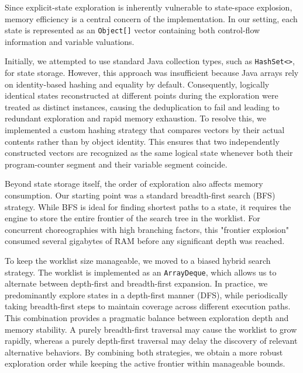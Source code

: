 Since explicit-state exploration is inherently vulnerable to state-space explosion, memory efficiency is a central concern of the implementation. In our setting, each state is represented as an \texttt{Object[]} vector containing both control-flow information and variable valuations.

Initially, we attempted to use standard Java collection types, such as \texttt{HashSet<>}, for state storage. However, this approach was insufficient because Java arrays rely on identity-based hashing and equality by default. Consequently, logically identical states reconstructed at different points during the exploration were treated as distinct instances, causing the deduplication to fail and leading to redundant exploration and rapid memory exhaustion. To resolve this, we implemented a custom hashing strategy that compares vectors by their actual contents rather than by object identity. This ensures that two independently constructed vectors are recognized as the same logical state whenever both their program-counter segment and their variable segment coincide.

Beyond state storage itself, the order of exploration also affects memory consumption. Our starting point was a standard breadth-first search (BFS) strategy. While BFS is ideal for finding shortest paths to a state, it requires the engine to store the entire frontier of the search tree in the worklist. For concurrent choreographies with high branching factors, this "frontier explosion" consumed several gigabytes of RAM before any significant depth was reached.

To keep the worklist size manageable, we moved to a biased hybrid search strategy. The worklist is implemented as an \texttt{ArrayDeque}, which allows us to alternate between depth-first and breadth-first expansion. In practice, we predominantly explore states in a depth-first manner (DFS), while periodically taking breadth-first steps to maintain coverage across different execution paths. This combination provides a pragmatic balance between exploration depth and memory stability. A purely breadth-first traversal may cause the worklist to grow rapidly, whereas a purely depth-first traversal may delay the discovery of relevant alternative behaviors. By combining both strategies, we obtain a more robust exploration order while keeping the active frontier within manageable bounds.
